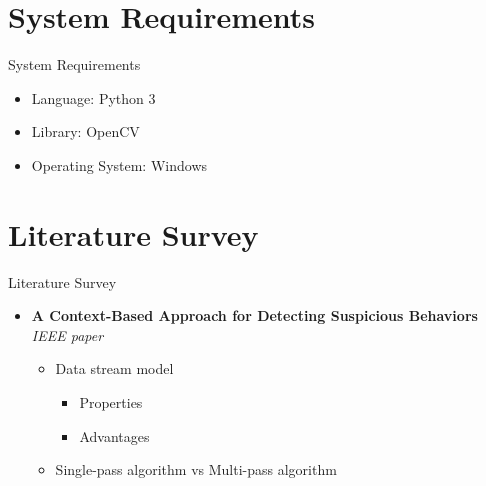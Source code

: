 \documentclass{beamer}
\begin{document}
\section{System Requirements} 
\begin{frame}{System Requirements}
  \begin{itemize}
    \justifying  
    \item Language: Python 3 
    \newline
    \item Library: OpenCV
    \newline
    \item Operating System: Windows
    \newline

  \end{itemize}
\end{frame}


\section{Literature Survey} 
\begin{frame}{Literature Survey}
  \begin{itemize}
    \item \textbf{A Context-Based Approach for Detecting Suspicious Behaviors}
    	  \newline 
          \textit{IEEE paper}
          \begin{itemize}
            \item Data stream model 
              \begin{itemize}
                \item Properties
                \item Advantages
              \end{itemize} 
            \item Single-pass algorithm vs Multi-pass algorithm
          \end{itemize}
  \end{itemize}
\end{frame}

\end{document}
